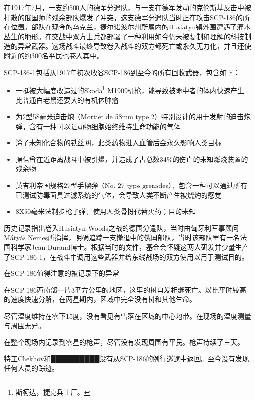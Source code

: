 在1917年7月，一支约500人的德军分遣队，与一支在德军发动的克伦斯基反击中被打散的俄国师的残余部队爆发了冲突，这支德军分遣队当时正在攻击SCP-186的所在位置。部队在现今的乌克兰，捷尔诺波尔州所属内的Husiatyn镇外围遭遇了灌木丛生的地形。在交战中双方士兵都部署了一种利用如今仍未被复制和理解的科技制造的异常武器。这场战斗最终导致卷入战斗的双方都死亡或永久无力化，并且还使附近的约300名平民也卷入其中。

SCP-186-1包括从1917年初次收容SCP-186到至今的所有回收武器，包含如下：

\begin{itemize}
\item 一挺被大幅度改造过的Skoda\footnote{斯柯达，捷克兵工厂。} M1909机枪，能导致被命中者的体内快速产生比普通白老鼠还要大的有机体肿瘤
\item 为2型58毫米迫击炮（Mortier de 58mm type 2）特别设计的用于发射的迫击炮弹，含有一种可以让动物细胞始终维持生命功能的气体
\item 涂了未知化合物的铁丝网，此类药物进入血管后会永久影响人类目标
\item 据信曾在近距离战斗中被引爆，并造成了占总数34\%的伤亡的未知燃烧装置的残余物
\item 英吉利帝国规格27型手榴弹（No. 27 type grenades），包含一种可以通过所有已测试防毒面具过滤系统的气体，会导致人类不断产生被烧灼的感觉
\item 8X50毫米法制步枪子弹，使用人类骨粉代替火药；目的未知
\end{itemize}

历史记录指出卷入Husiatyn Woods之战的德国分遣队，当时由匈牙利军事顾问Mátyás Nemeş所指挥，明确追踪一支撤退中的俄国部队，当时该部队里有一名法国科学家Jean Durand博士。根据当时的文件，基金会怀疑这两人研发并少量生产了SCP-186-1，在战斗中调用这些武器并给东线战场的双方使用以用于测试目的。



在SCP-186值得注意的被记录下的异常

在SCP-186西南部一片3平方公里的地区，这里的树自发相继死亡。以比平时较高的速度快速分解，在两星期内，区域中完全没有树和其他生命。

尽管温度维持在零下15度，没有看见有雪落在区域的中心地带。在现场的温度测量与周围无异。

在整个现场内记录到零星的枪声，尽管没有发现周围有平民。枪声持续了三天。

特工Chekhov和██████████没有从SCP-186的例行巡逻中返回。至今没有发现任何人员的踪迹。

